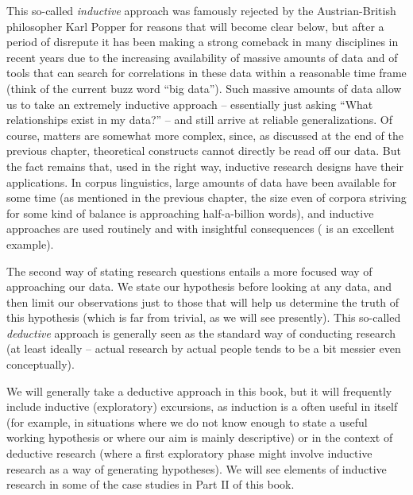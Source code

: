 This so\hyp{}called \emph{inductive}  approach was famously rejected by the Austrian-Brit\-ish philosopher Karl Popper for reasons that will become clear below, but after a period of disrepute it has been making a strong comeback in many disciplines in recent years due to the increasing availability of massive amounts of data and of tools that can search for correlations  in these data within a reasonable time frame (think of the current buzz word ``big data''). Such massive amounts of data allow us to take an extremely inductive  approach -- essentially just asking ``What relationships exist in my data?'' -- and still arrive at reliable  generalizations. Of course, matters are somewhat more complex, since, as discussed at the end of the previous chapter, theoretical constructs cannot directly be read off our data. But the fact remains that, used in the right way, inductive  research designs  have their applications. In corpus linguistics, large  amounts of data have been available for some time (as mentioned in the previous chapter, the size even of corpora striving for some kind of balance is approaching half\hyp{}a-billion words), and inductive approaches are used routinely and with insightful consequences (\citealt{sinclair_corpus_1991} is an excellent example).

The second way of stating research questions entails a more focused way of approaching our data. We state our hypothesis  before looking at any data, and then limit our observations  just to those that will help us determine the truth of this hypothesis (which is far from trivial, as we will see presently). This so\hyp{}called \emph{deductive}  approach is generally seen as the standard way of conducting research (at least ideally -- actual research by actual people tends to be a bit messier even conceptually).

We will generally take a deductive  approach in this book, but it will frequently include inductive (exploratory) excursions, as induction  is a often useful in itself (for example, in situations where we do not know enough to state a useful working hypothesis  or where our aim is mainly descriptive)  or in the context of deductive research (where a first exploratory  phase might involve inductive  research as a way of generating hypotheses). We will see elements of inductive research in some of the case studies in Part II of this book.

